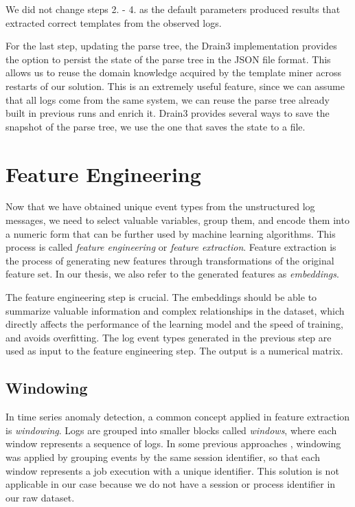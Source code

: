 We did not change steps 2. - 4. as the default parameters \cite{ibmdrain3} produced results that extracted correct templates from the observed logs.

For the last step, updating the parse tree, the Drain3 implementation provides the option to persist the state of the parse tree in the JSON file format. This allows us to reuse the domain knowledge acquired by the template miner across restarts of our solution.
This is an extremely useful feature, since we can assume that all logs come from the same system, we can reuse the parse tree already built in previous runs and enrich it.
Drain3 provides several ways to save the snapshot of the parse tree, we use the one that saves the state to a file.

\section{Feature Engineering}
\label{section:featureEngineering}
Now that we have obtained unique event types from the unstructured log messages, we need to select valuable variables, group them, and encode them into a numeric form that can be further used by machine learning algorithms. This process is called \textit{feature engineering} or \textit{feature extraction}. Feature extraction is the process of generating new features through transformations of the original feature set. In our thesis, we also refer to the generated features as \textit{embeddings}.

The feature engineering step is crucial. The embeddings should be able to summarize valuable information and complex relationships in the dataset, which directly affects the performance of the learning model and the speed of training, and avoids overfitting. The log event types generated in the previous step are used as input to the feature engineering step. The output is a numerical matrix. 

\subsection{Windowing}

In time series anomaly detection, a common concept applied in feature extraction is \textit{windowing}. 
Logs are grouped into smaller blocks called \textit{windows}, where each window represents a sequence of logs. In some previous approaches \cite{xu2009}, windowing was applied by grouping events by the same session identifier, so that each window represents a job execution with a unique identifier. This solution is not applicable in our case because we do not have a session or process identifier in our raw dataset.


